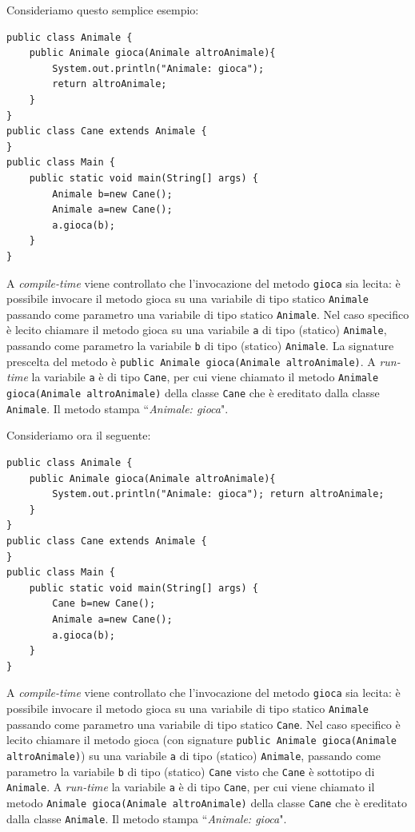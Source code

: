 \documentclass{article}
\begin{document}
Consideriamo questo semplice esempio:

\begin{lstlisting}
public class Animale {
    public Animale gioca(Animale altroAnimale){
        System.out.println("Animale: gioca"); 
        return altroAnimale;
    }
}
public class Cane extends Animale { 
}
public class Main {
    public static void main(String[] args) { 
        Animale b=new Cane();
        Animale a=new Cane();
        a.gioca(b);
    } 
}
\end{lstlisting}

A \emph{compile-time} viene controllato che l'invocazione del metodo \texttt{gioca} sia lecita: \`e possibile invocare il metodo gioca su una variabile di tipo statico \texttt{Animale} passando come parametro una variabile di tipo statico \texttt{Animale}. Nel caso specifico \`e lecito chiamare il metodo gioca su una variabile \texttt{a} di tipo (statico) \texttt{Animale}, passando come parametro la variabile \texttt{b} di tipo (statico) \texttt{Animale}. La signature prescelta del metodo \`e \texttt{public Animale gioca(Animale altroAnimale)}. A \emph{run-time} la variabile \texttt{a} \`e di tipo \texttt{Cane}, per cui viene chiamato il metodo \texttt{Animale gioca(Animale altroAnimale)} della classe \texttt{Cane} che \`e ereditato dalla classe \texttt{Animale}. Il metodo stampa ``\textit{Animale: gioca}".

Consideriamo ora il seguente:
\begin{lstlisting}
public class Animale {
    public Animale gioca(Animale altroAnimale){
        System.out.println("Animale: gioca"); return altroAnimale;
    }
}
public class Cane extends Animale { 
}
public class Main {
    public static void main(String[] args) { 
        Cane b=new Cane();
        Animale a=new Cane();
        a.gioca(b);
    } 
}
\end{lstlisting}

A \emph{compile-time} viene controllato che l'invocazione del metodo \texttt{gioca} sia lecita: \`e possibile invocare il metodo gioca su una variabile di tipo statico \texttt{Animale} passando come parametro una variabile di tipo statico \texttt{Cane}. Nel caso specifico \`e lecito chiamare il metodo gioca (con signature \texttt{public Animale gioca(Animale altroAnimale)}) su una variabile \texttt{a} di tipo (statico) \texttt{Animale}, passando come parametro la variabile \texttt{b} di tipo (statico) \texttt{Cane} visto che \texttt{Cane} \`e sottotipo di \texttt{Animale}. A \emph{run-time} la variabile \texttt{a} \`e di tipo \texttt{Cane}, per cui viene chiamato il metodo \texttt{Animale gioca(Animale altroAnimale)} della classe \texttt{Cane} che \`e ereditato dalla classe \texttt{Animale}. Il metodo stampa ``\textit{Animale: gioca}".
\end{document}
